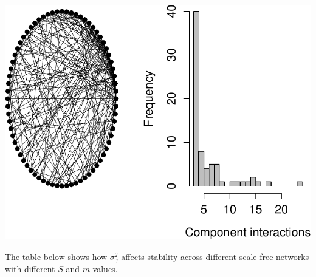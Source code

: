 \documentclass[]{article}
\begin{document}
\begin{center}\includegraphics{unnamed-chunk-26-1} \end{center}

The table below shows how \(\sigma^{2}_\gamma\) affects stability across
different scale-free networks with different \(S\) and \(m\) values.
\end{document}
